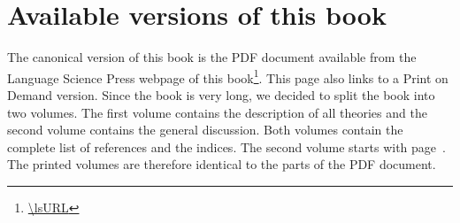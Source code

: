 
\section*{Available versions of this book}

The canonical version of this book is the PDF document available from the Language Science Press
webpage of this book\footnote{
\url{\lsURL}
}. This page also links to a Print on Demand version. Since the book is very long, we decided to
split the book into two volumes. The first volume contains the description of all theories and the
second volume contains the general discussion. Both volumes contain the complete list of references
and the indices. The second volume starts with page~\pageref{part-discussion}. The printed volumes
are therefore identical to the parts of the PDF document.







